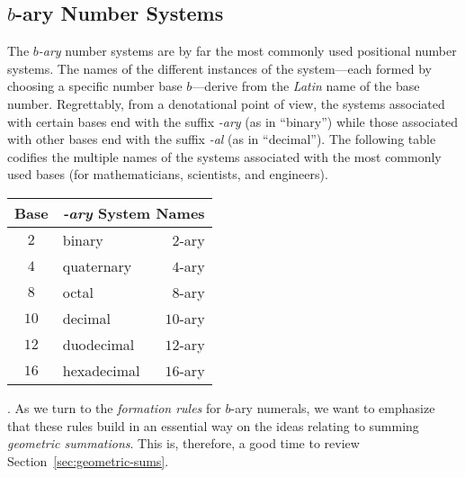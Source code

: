 \subsection{$b$-ary Number Systems}
\label{sec:b-ary-systems}

The {\it $b$-ary} number systems are by far the most commonly used positional number systems.  The names of the different instances of the system---each formed by choosing a specific number base $b$---derive from the {\em Latin} name of the base number.  Regrettably, from a denotational point of view, the systems associated with certain bases end with the suffix {\em -ary} (as in ``binary'') while those associated with other bases end with the suffix {\em -al}
(as in ``decimal'').  The following table codifies the multiple names of the systems associated with the most commonly used bases (for mathematicians, scientists, and engineers).

\medskip

\begin{tabular}{|c|l|r|}
\hline
{\bf Base} & \multicolumn{2}{c}{\bf {\em -ary} System Names}  \\
\hline
$2$   & binary     & $2$-ary  \\
\hline 
$4$   & quaternary & $4$-ary  \\
\hline
$8$   & octal      & $8$-ary \\
\hline
$10$  & decimal    & $10$-ary  \\
\hline
$12$  & duodecimal & $12$-ary  \\
\hline
$16$  & hexadecimal & $16$-ary \\
\hline
\end{tabular}

\bigskip

.
As we turn to the {\it formation rules} for $b$-ary numerals, we want to emphasize that these rules build in an essential way on the ideas relating to summing {\em geometric summations}.  This is, therefore, a good time to review Section~\ref{sec:geometric-sums}.

\medskip



